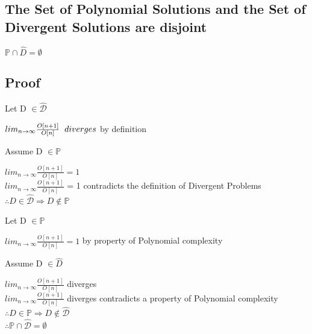 \documentclass[11pt]{article}
\begin{document}




\subsection{The Set of Polynomial Solutions and the Set of Divergent Solutions are disjoint}
\begin{center}
\vspace{2mm}
$
\mathbb{P} \cap \hat{D} = \emptyset
$
\end{center}

\subsection{Proof}
Let D $\in \hat{\mathcal{D}}$
\begin{center}
$
lim_{n \rightarrow \infty} \frac{O[n+1]}{O[n]} \hspace{2mm} diverges$ by definition
\end{center}
\vspace{4mm}
Assume D $\in \mathbb{P}$
\begin{center}
$
lim_{n \rightarrow \infty} \frac{O[n+1]}{O[n]} = 1
$
\\ \vspace{2mm}
$
 lim_{n \rightarrow \infty} \frac{O[n+1]}{O[n]}$ = 1 contradicts the definition of Divergent Problems
\\ \vspace{2mm}
$
\therefore D \in \hat{\mathcal{D}} \Rightarrow D \not \in \mathbb{P}
$
\end{center}
\vspace{12mm}
Let D $\in \mathbb{P}$
\begin{center}
$
lim_{n \rightarrow \infty} \frac{O[n+1]}{O[n]} = 1$ by property of Polynomial complexity
\end{center}
\vspace{4mm}
Assume D $\in \hat{D}$
\begin{center}
$
lim_{n \rightarrow \infty} \frac{O[n+1]}{O[n]}$ diverges
\\ \vspace{2mm}
$
 lim_{n \rightarrow \infty} \frac{O[n+1]}{O[n]}$ diverges contradicts a property of Polynomial complexity
\\ \vspace{2mm}
$
\therefore D \in \mathbb{P} \Rightarrow D \not \in \hat{\mathcal{D}}
$
\\ \vspace{2mm}
$
\therefore \mathbb{P} \cap \hat{\mathcal{D}} = \emptyset
$
\end{center}
\end{document}
